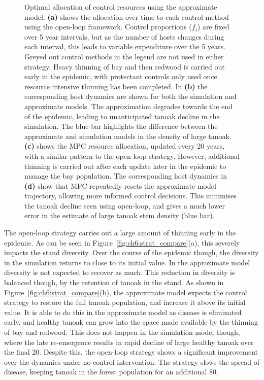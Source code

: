 \begin{figure}
    \begin{center}
        \caption[Open-loop and MPC optimal control strategies]{Optimal allocation of control resources using the approximate model. \textbf{(a)} shows the allocation over time to each control method using the open-loop framework. Control proportions ($f_i$) are fixed over 5 year intervals, but as the number of hosts changes during each interval, this leads to variable expenditure over the 5 years. Greyed out control methods in the legend are not used in either strategy. Heavy thinning of bay and then redwood is carried out early in the epidemic, with protectant controls only used once resource intensive thinning has been completed. In \textbf{(b)} the corresponding host dynamics are shown for both the simulation and approximate models. The approximation degrades towards the end of the epidemic, leading to unanticipated tanoak decline in the simulation. The blue bar highlights the difference between the approximate and simulation models in the density of large tanoak. \textbf{(c)} shows the MPC resource allocation, updated every 20 years, with a similar pattern to the open-loop strategy. However, additional thinning is carried out after each update later in the epidemic to manage the bay population. The corresponding host dynamics in \textbf{(d)} show that MPC repeatedly resets the approximate model trajectory, allowing more informed control decisions. This minimises the tanoak decline seen using open-loop, and gives a much lower error in the estimate of large tanoak stem density (blue bar).\label{fig:ch6:strats}}
    \end{center}
\end{figure}

The open-loop strategy carries out a large amount of thinning early in the epidemic. As can be seen in Figure~\ref{fig:ch6:strat_compare}(a), this severely impacts the stand diversity. Over the course of the epidemic though, the diversity in the simulation returns to close to its initial value. In the approximate model diversity is not expected to recover as much. This reduction in diversity is balanced though, by the retention of tanoak in the stand. As shown in Figure~\ref{fig:ch6:strat_compare}(b), the approximate model expects the control strategy to restore the full tanoak population, and increase it above its initial value. It is able to do this in the approximate model as disease is eliminated early, and healthy tanoak can grow into the space made available by the thinning of bay and redwood. This does not happen in the simulation model though, where the late re-emergence results in rapid decline of large healthy tanoak over the final \SI{20}{\years}. Despite this, the open-loop strategy shows a significant improvement over the dynamics under no control intervention. The strategy slows the spread of disease, keeping tanoak in the forest population for an additional \SI{80}{\years}.

